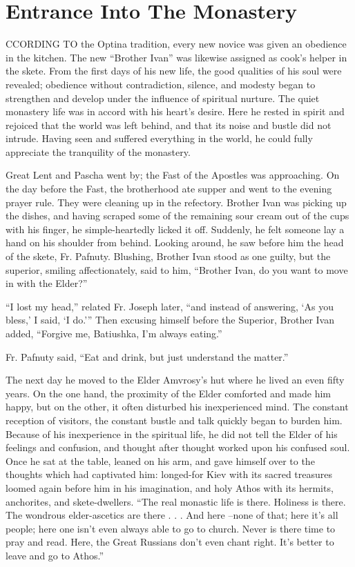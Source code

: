 \chapter{Entrance Into The Monastery}
CCORDING TO the Optina tradition, every new novice was given an obedience in the kitchen. The new ``Brother Ivan'' was likewise assigned as cook's helper in the skete. From the first days of his new life, the good qualities of his soul were revealed; obedience without contradiction, silence, and modesty began to strengthen and develop under the influence of spiritual nurture. The quiet monastery life was in accord with his heart's desire. Here he rested in spirit and rejoiced that the world was left behind, and that its noise and bustle did not intrude. Having seen and suffered everything in the world, he could fully appreciate the tranquility of the monastery.

Great Lent and Pascha went by; the Fast of the Apostles was approaching. On the day before the Fast, the brotherhood ate supper and went to the evening prayer rule. They were cleaning up in the refectory. Brother Ivan was picking up the dishes, and having scraped some of the remaining sour cream out of the cups with his finger, he simple-heartedly licked it off. Suddenly, he felt someone lay a hand on his shoulder from behind. Looking around, he saw before him the head of the skete, Fr. Pafnuty. Blushing, Brother Ivan stood as one guilty, but the superior, smiling affectionately, said to him, ``Brother Ivan, do you want to move in with the Elder?''

``I lost my head,'' related Fr. Joseph later, ``and instead of answering, `As you bless,' I said, `I do.''' Then excusing himself before the Superior, Brother Ivan added, ``Forgive me, Batiushka, I'm always eating.''

Fr. Pafnuty said, ``Eat and drink, but just understand the matter.''

The next day he moved to the Elder Amvrosy's hut where he lived an even fifty years. On the one hand, the proximity of the Elder comforted and made him happy, but on the other, it often disturbed his inexperienced mind. The constant reception of visitors, the constant bustle and talk quickly began to burden him. Because of his inexperience in the spiritual life, he did not tell the Elder of his feelings and confusion, and thought after thought worked upon his confused soul. Once he sat at the table, leaned on his arm, and gave himself over to the thoughts which had captivated him: longed-for Kiev with its sacred treasures loomed again before him in his imagination, and holy Athos with its hermits, anchorites, and skete-dwellers. ``The real monastic life is there. Holiness is there. The wondrous elder-ascetics are there . . . And here --none of that; here it's all people; here one isn't even always able to go to church. Never is there time to pray and read. Here, the Great Russians don't even chant right. It's better to leave and go to Athos.''

